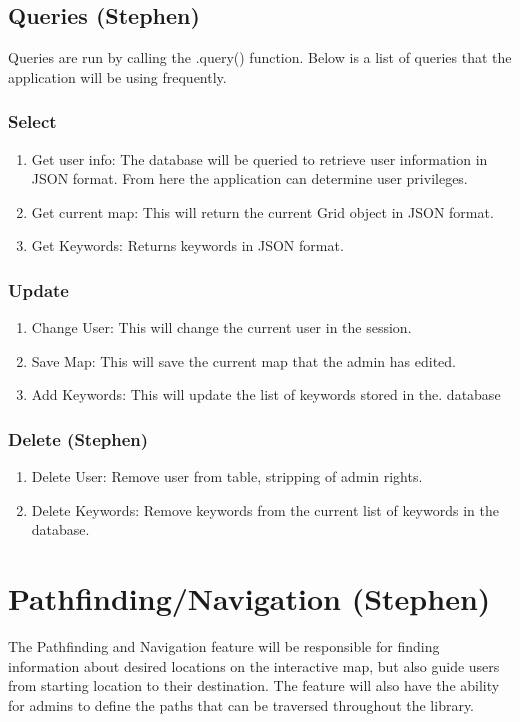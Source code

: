 \documentclass[letterpaper,10pt,titlepage, onecolumn, compsoc]{IEEEtran}
\begin{document}
\subsection{Queries (Stephen)}
 Queries are run by calling the .query() function. Below is a list of queries that the application will be using frequently.

\subsubsection{Select}
\begin{enumerate}
	\item Get user info: The database will be queried to retrieve user information in JSON format. From here the application can determine user privileges.
    \item Get current map: This will return the current Grid object in JSON format.
    \item Get Keywords: Returns keywords in JSON format.
\end{enumerate}
\subsubsection{Update}
\begin{enumerate}
	\item Change User: This will change the current user in the session.
    \item Save Map: This will save the current map that the admin has edited.
    \item  Add Keywords: This will update the list of keywords stored in the. database
\end{enumerate}

\subsubsection{Delete (Stephen)}
\begin{enumerate}
	\item Delete User: Remove user from table, stripping of admin rights.
    \item Delete Keywords: Remove keywords from the current list of keywords in the database.
\end{enumerate}

\section{Pathfinding/Navigation (Stephen)}
The Pathfinding and Navigation feature will be responsible for finding information about desired locations on the interactive map, but also guide users from starting location to their destination. The feature will also have the ability for admins to define the paths that can be traversed throughout the library.
\end{document}
